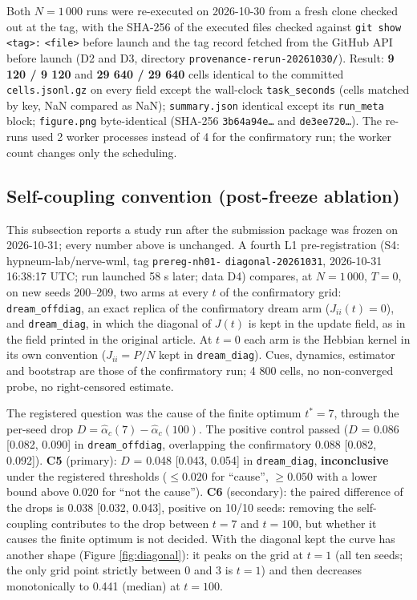 Both \(N = 1\,000\) runs were re-executed on 2026-10-30 from a fresh
clone checked out at the tag, with the SHA-256 of the executed files
checked against \texttt{git\ show}
\texttt{\textless{}tag\textgreater{}:}
\texttt{\textless{}file\textgreater{}} before launch and the tag record
fetched from the GitHub API before launch (D2 and D3, directory
\texttt{provenance-rerun-20261030/}). Result: \textbf{9 120 / 9 120} and
\textbf{29 640 / 29 640} cells identical to the committed
\texttt{cells.jsonl.gz} on every field except the wall-clock
\texttt{task\_seconds} (cells matched by key, NaN compared as NaN);
\texttt{summary.json} identical except its \texttt{run\_meta} block;
\texttt{figure.png} byte-identical (SHA-256 \texttt{3b64a94e…} and
\texttt{de3ee720…}). The re-runs used 2 worker processes instead of 4
for the confirmatory run; the worker count changes only the scheduling.

\subsection{Self-coupling convention (post-freeze
ablation)}\label{self-coupling-convention-post-freeze-ablation}

This subsection reports a study run after the submission package was
frozen on 2026-10-31; every number above is unchanged. A fourth L1
pre-registration (S4: hypneum-lab/nerve-wml, tag \texttt{prereg-nh01-}
\texttt{diagonal-20261031}, 2026-10-31 16:38:17 UTC; run launched 58 s
later; data D4) compares, at \(N = 1\,000\), \(T = 0\), on new seeds
200--209, two arms at every \(t\) of the confirmatory grid:
\texttt{dream\_offdiag}, an exact replica of the confirmatory dream arm
(\(J_{ii}(t) = 0\)), and \texttt{dream\_diag}, in which the diagonal of
\(J(t)\) is kept in the update field, as in the field printed in the
original article. At \(t = 0\) each arm is the Hebbian kernel in its own
convention (\(J_{ii} = P/N\) kept in \texttt{dream\_diag}). Cues,
dynamics, estimator and bootstrap are those of the confirmatory run; 4
800 cells, no non-converged probe, no right-censored estimate.

The registered question was the cause of the finite optimum \(t^* = 7\),
through the per-seed drop \(D = \hat\alpha_c(7) - \hat\alpha_c(100)\).
The positive control passed (\(D\) = 0.086 {[}0.082, 0.090{]} in
\texttt{dream\_offdiag}, overlapping the confirmatory 0.088 {[}0.082,
0.092{]}). \textbf{C5} (primary): \(D\) = 0.048 {[}0.043, 0.054{]} in
\texttt{dream\_diag}, \textbf{inconclusive} under the registered
thresholds (\(\le 0.020\) for ``cause'', \(\ge 0.050\) with a lower
bound above 0.020 for ``not the cause''). \textbf{C6} (secondary): the
paired difference of the drops is 0.038 {[}0.032, 0.043{]}, positive on
10/10 seeds: removing the self-coupling contributes to the drop between
\(t = 7\) and \(t = 100\), but whether it causes the finite optimum is
not decided. With the diagonal kept the curve has another shape (Figure
\ref{fig:diagonal}): it peaks on the grid at \(t = 1\) (all ten seeds;
the only grid point strictly between 0 and 3 is \(t = 1\)) and then
decreases monotonically to 0.441 (median) at \(t = 100\).

